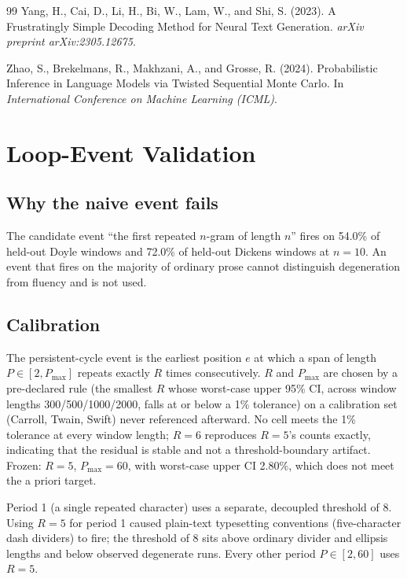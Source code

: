 \documentclass[11pt]{article}
\begin{document}
\begin{thebibliography}{99}
Yang, H., Cai, D., Li, H., Bi, W., Lam, W., and Shi, S. (2023).
\newblock A Frustratingly Simple Decoding Method for Neural Text Generation.
\newblock \emph{arXiv preprint arXiv:2305.12675}.

Zhao, S., Brekelmans, R., Makhzani, A., and Grosse, R. (2024).
\newblock Probabilistic Inference in Language Models via Twisted Sequential Monte Carlo.
\newblock In \emph{International Conference on Machine Learning (ICML)}.

\end{thebibliography}

\appendix
\section{Loop-Event Validation}
\label{sec:event}

\subsection{Why the naive event fails}
\label{ssec:naive-fails}
The candidate event ``the first repeated $n$-gram of length $n$'' fires on 54.0\% of held-out Doyle windows and 72.0\% of held-out Dickens windows at $n{=}10$. An event that fires on the majority of ordinary prose cannot distinguish degeneration from fluency and is not used.

\subsection{Calibration}
The persistent-cycle event is the earliest position $e$ at which a span of length $P\in[2,P_{\max}]$ repeats exactly $R$ times consecutively. $R$ and $P_{\max}$ are chosen by a pre-declared rule (the smallest $R$ whose worst-case upper 95\% CI, across window lengths 300/500/1000/2000, falls at or below a 1\% tolerance) on a calibration set (Carroll, Twain, Swift) never referenced afterward. No cell meets the 1\% tolerance at every window length; $R{=}6$ reproduces $R{=}5$'s counts exactly, indicating that the residual is stable and not a threshold-boundary artifact. Frozen: $R{=}5$, $P_{\max}{=}60$, with worst-case upper CI 2.80\%, which does not meet the a priori target.

Period 1 (a single repeated character) uses a separate, decoupled threshold of 8. Using $R{=}5$ for period 1 caused plain-text typesetting conventions (five-character dash dividers) to fire; the threshold of 8 sits above ordinary divider and ellipsis lengths and below observed degenerate runs. Every other period $P\in[2,60]$ uses $R{=}5$.
\end{document}
